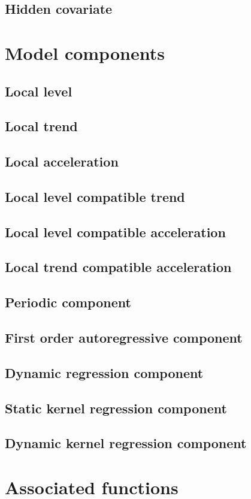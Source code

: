 \documentclass{book}
\begin{document}
\subsection{Hidden covariate}
\section{Model components}
\subsection{Local level}
\subsection{Local trend}
\subsection{Local acceleration}
\subsection{Local level compatible trend}
\subsection{Local level compatible acceleration}
\subsection{Local trend compatible acceleration}
\subsection{Periodic component}
\subsection{First order autoregressive component}
\subsection{Dynamic regression component}
\subsection{Static kernel regression component}
\subsection{Dynamic kernel regression component}
\section{Associated functions}
\newpage
\end{document}
